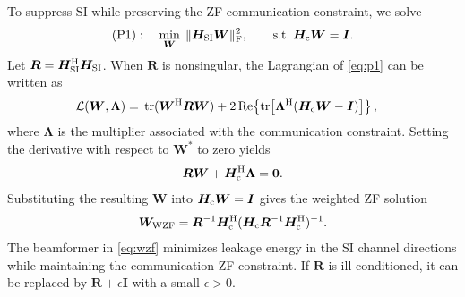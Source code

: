 \documentclass[conference]{IEEEtran}
\begin{document}
To suppress SI while preserving the ZF communication constraint, we solve
\begin{align}
    \mathrm{(P1)}:\quad
    \min_{\bm{W}}\;\|\bm{H}_{\rm SI}\bm{W}\|_{\rm F}^2,
    \qquad
    \mathrm{s.t.}\;\bm{H}_{\rm c}\bm{W}=\bm{I}.
    \label{eq:p1}
\end{align}
Let $\bm{R}=\bm{H}_{\rm SI}^{\rm H}\bm{H}_{\rm SI}$. When $\bm{R}$ is nonsingular, the Lagrangian of \eqref{eq:p1} can be written as
\begin{align}
\mathcal{L}(\bm{W},\bm{\Lambda})={}&\operatorname{tr}(\bm{W}^{\rm H}\bm{R}\bm{W})
+2\operatorname{Re}\!\left\{\operatorname{tr}\!\left[\bm{\Lambda}^{\rm H}
(\bm{H}_{\rm c}\bm{W}-\bm{I})\right]\right\},
\label{eq:lagrangian}
\end{align}
where $\bm{\Lambda}$ is the multiplier associated with the communication constraint. Setting the derivative with respect to $\bm{W}^{*}$ to zero yields
\begin{align}
    \bm{R}\bm{W}+\bm{H}_{\rm c}^{\rm H}\bm{\Lambda}=\bm{0}.
    \label{eq:stationarity}
\end{align}
Substituting the resulting $\bm{W}$ into $\bm{H}_{\rm c}\bm{W}=\bm{I}$ gives the weighted ZF solution
\begin{align}
    \bm{W}_{\rm WZF}=\bm{R}^{-1}\bm{H}_{\rm c}^{\rm H}
    (\bm{H}_{\rm c}\bm{R}^{-1}\bm{H}_{\rm c}^{\rm H})^{-1}.
    \label{eq:wzf}
\end{align}
The beamformer in \eqref{eq:wzf} minimizes leakage energy in the SI channel directions while maintaining the communication ZF constraint. If $\bm{R}$ is ill-conditioned, it can be replaced by $\bm{R}+\epsilon\bm{I}$ with a small $\epsilon>0$.
\end{document}
